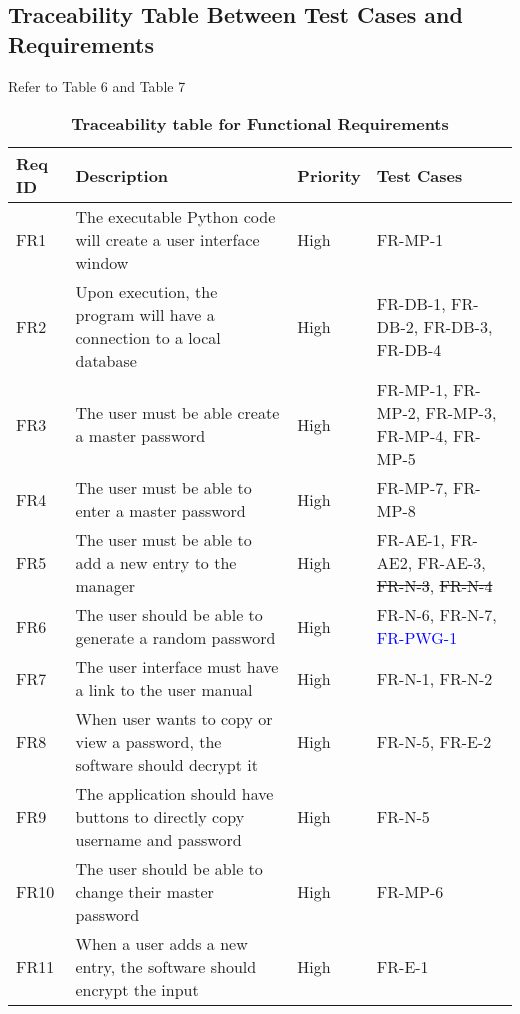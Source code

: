\documentclass[12pt, titlepage]{article}
\begin{document}
\subsection{Traceability Table Between Test Cases and Requirements}
Refer to Table 6 and Table 7
\begin{table}[!htbp]
    \caption{\textbf{Traceability table for Functional Requirements}} \label{Table}
    \begin{tabularx}{\textwidth}{p{2cm}Xp{2cm}X}
        \toprule
        \textbf{Req ID} & \textbf{Description} & \textbf{Priority} & \textbf{Test Cases}\\
        \midrule
        FR1  & The executable Python code will create a user interface window & High & FR-MP-1\\\hline
        FR2  & Upon execution, the program will have a connection to a local database & High & FR-DB-1, FR-DB-2, FR-DB-3, FR-DB-4\\\hline
        FR3  & The user must be able create a master password & High & FR-MP-1, FR-MP-2, FR-MP-3, FR-MP-4, FR-MP-5\\\hline
        FR4  & The user must be able to enter a master password & High & FR-MP-7, FR-MP-8\\\hline
        FR5  & The user must be able to add a new entry to the manager & High & FR-AE-1, FR-AE2, FR-AE-3, \sout{FR-N-3}, \sout{FR-N-4}\\\hline
        FR6  & The user should be able to generate a random password  & High & FR-N-6, FR-N-7, \textcolor{blue}{FR-PWG-1}\\\hline
        FR7  & The user interface must have a link to the user manual & High & FR-N-1, FR-N-2\\\hline
        FR8  & When user wants to copy or view a password, the software should decrypt it & High & FR-N-5, FR-E-2\\\hline
        FR9  & The application should have buttons to directly copy username and password & High & FR-N-5\\\hline
        FR10 & The user should be able to change their master password  & High & FR-MP-6\\\hline
        FR11 & When a user adds a new entry, the software should encrypt the input & High & FR-E-1\\
    
        \bottomrule
    \end{tabularx}
\end{table}
\end{document}
